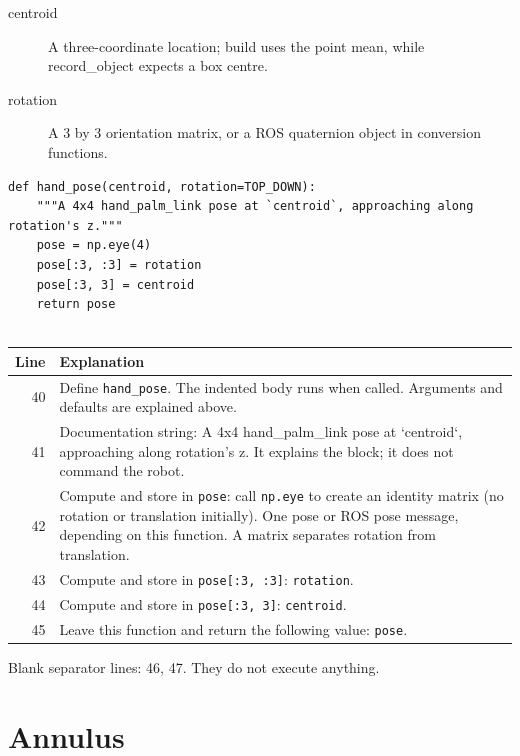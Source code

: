 \documentclass[11pt,a4paper]{book}
\begin{document}
\begin{description}
\item[centroid] A three-coordinate location; build uses the point mean, while record\_object expects a box centre.
\item[rotation] A 3 by 3 orientation matrix, or a ROS quaternion object in conversion functions.
\end{description}

\begin{lstlisting}[firstnumber=40]
def hand_pose(centroid, rotation=TOP_DOWN):
    """A 4x4 hand_palm_link pose at `centroid`, approaching along rotation's z."""
    pose = np.eye(4)
    pose[:3, :3] = rotation
    pose[:3, 3] = centroid
    return pose


\end{lstlisting}

\begin{longtable}{r p{}}

\textbf{Line} & \textbf{Explanation} \\ \hline \endhead

40 & Define \texttt{hand\_pose}. The indented body runs when called. Arguments and defaults are explained above. \\

41 & Documentation string: A 4x4 hand\_palm\_link pose at `centroid`, approaching along rotation's z. It explains the block; it does not command the robot. \\

42 & Compute and store in \texttt{pose}: call \texttt{np.eye} to create an identity matrix (no rotation or translation initially). One pose or ROS pose message, depending on this function. A matrix separates rotation from translation. \\

43 & Compute and store in \texttt{pose[:3, :3]}: \texttt{rotation}.  \\

44 & Compute and store in \texttt{pose[:3, 3]}: \texttt{centroid}.  \\

45 & Leave this function and return the following value: \texttt{pose}. \\

\end{longtable}

Blank separator lines: 46, 47. They do not execute anything.

\section{Annulus}
\end{document}
